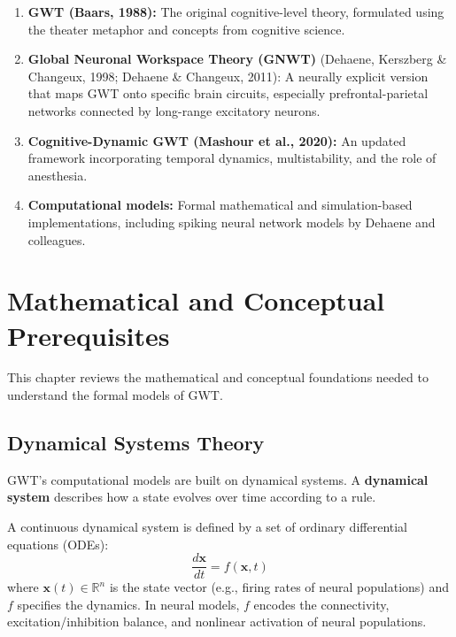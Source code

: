 \documentclass[11pt,a4paper]{report}
\begin{document}
\begin{enumerate}[leftmargin=2em]
  \item \textbf{GWT (Baars, 1988):} The original cognitive-level theory, formulated using the theater metaphor and concepts from cognitive science.
  \item \textbf{Global Neuronal Workspace Theory (GNWT)} (Dehaene, Kerszberg \& Changeux, 1998; Dehaene \& Changeux, 2011): A neurally explicit version that maps GWT onto specific brain circuits, especially prefrontal-parietal networks connected by long-range excitatory neurons.
  \item \textbf{Cognitive-Dynamic GWT (Mashour et al., 2020):} An updated framework incorporating temporal dynamics, multistability, and the role of anesthesia.
  \item \textbf{Computational models:} Formal mathematical and simulation-based implementations, including spiking neural network models by Dehaene and colleagues.
\end{enumerate}


\chapter{Mathematical and Conceptual Prerequisites}

This chapter reviews the mathematical and conceptual foundations needed to understand the formal models of GWT.

\section{Dynamical Systems Theory}

GWT's computational models are built on dynamical systems. A \textbf{dynamical system} describes how a state evolves over time according to a rule.

\begin{definitionbox}
A continuous dynamical system is defined by a set of ordinary differential equations (ODEs):
\[
  \frac{d\mathbf{x}}{dt} = f(\mathbf{x}, t)
\]
where $\mathbf{x}(t) \in \mathbb{R}^n$ is the state vector (e.g., firing rates of neural populations) and $f$ specifies the dynamics. In neural models, $f$ encodes the connectivity, excitation/inhibition balance, and nonlinear activation of neural populations.
\end{definitionbox}
\end{document}
